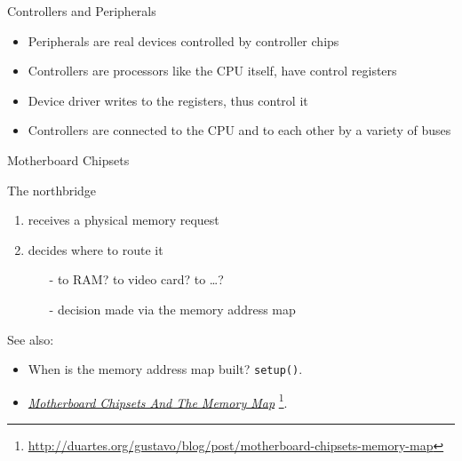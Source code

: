 \begin{frame}{Controllers and Peripherals}
  \begin{itemize}
  \item Peripherals are real devices controlled by controller chips
  \item Controllers are processors like the CPU itself, have control registers
  \item Device driver writes to the registers, thus control it
  \item Controllers are connected to the CPU and to each other by a variety of buses
  \end{itemize}
\end{frame}

\begin{frame}[label=current]
  \begin{center}
  \end{center}
\end{frame}

\begin{frame}{Motherboard Chipsets}
  \begin{center}
  \end{center}
  \begin{block}{The northbridge}
    \begin{enumerate}
    \item receives a physical memory request
    \item decides where to route it
      \begin{itemize}
      \item[-] to RAM? to video card? to \ldots{}?
      \item[-] decision made via the \alert{memory address map}
      \end{itemize}
    \end{enumerate}
  \end{block}
\end{frame}

See also:
\begin{itemize}
\item When is the memory address map built? \texttt{setup()}.
\item
  \href{http://duartes.org/gustavo/blog/post/motherboard-chipsets-memory-map}{\emph{Motherboard
      Chipsets And The Memory Map}}
  \footnote{\url{http://duartes.org/gustavo/blog/post/motherboard-chipsets-memory-map}}.
\end{itemize}


